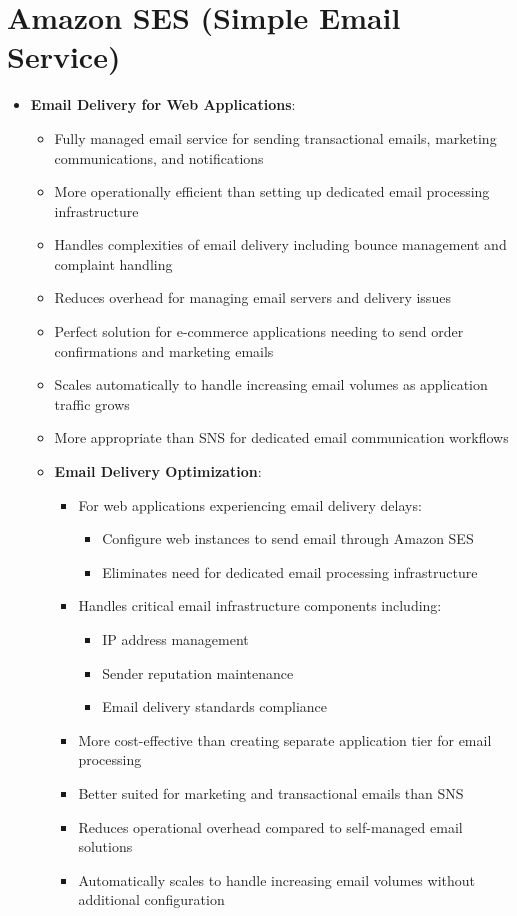 \documentclass[11pt,a4paper]{report}
\begin{document}
\section{Amazon SES (Simple Email Service)}

\begin{itemize}
  \item \textbf{Email Delivery for Web Applications}:
\begin{itemize}
  \item Fully managed email service for sending transactional emails, marketing communications, and notifications
  \item More operationally efficient than setting up dedicated email processing infrastructure
  \item Handles complexities of email delivery including bounce management and complaint handling
  \item Reduces overhead for managing email servers and delivery issues
  \item Perfect solution for e-commerce applications needing to send order confirmations and marketing emails
  \item Scales automatically to handle increasing email volumes as application traffic grows
  \item More appropriate than SNS for dedicated email communication workflows
  \item \textbf{Email Delivery Optimization}:
\begin{itemize}
  \item For web applications experiencing email delivery delays:
\begin{itemize}
  \item Configure web instances to send email through Amazon SES
  \item Eliminates need for dedicated email processing infrastructure
\end{itemize}
  \item Handles critical email infrastructure components including:
\begin{itemize}
  \item IP address management
  \item Sender reputation maintenance
  \item Email delivery standards compliance
\end{itemize}
  \item More cost-effective than creating separate application tier for email processing
  \item Better suited for marketing and transactional emails than SNS
  \item Reduces operational overhead compared to self-managed email solutions
  \item Automatically scales to handle increasing email volumes without additional configuration
\end{itemize}
\end{itemize}
\end{itemize}
\end{document}
